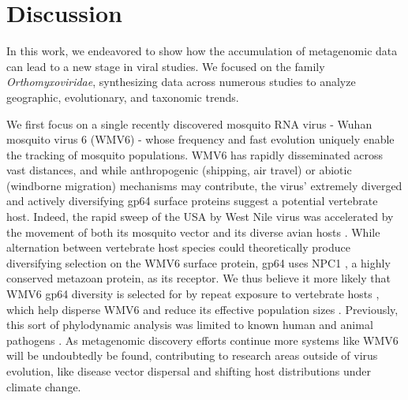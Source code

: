 \documentclass[11pt,twocolumn]{article}
\begin{document}
\section{Discussion}

In this work, we endeavored to show how the accumulation of metagenomic data can lead to a new stage in viral studies. We focused on the family \textit{Orthomyxoviridae}, synthesizing data across numerous studies to analyze geographic, evolutionary, and taxonomic trends.

We first focus on a single recently discovered mosquito RNA virus - Wuhan mosquito virus 6 \citep{li_unprecedented_2015} (WMV6) - whose frequency and fast evolution uniquely enable the tracking of mosquito populations. WMV6 has rapidly disseminated across vast distances, and while anthropogenic (shipping, air travel) \citep{lounibos_invasions_2002,fonseca_pathways_2006,bataille_evidence_2009} or abiotic (windborne migration) \citep{huestis_windborne_2019} mechanisms may contribute, the virus' extremely diverged and actively diversifying gp64 surface proteins suggest a potential vertebrate host. Indeed, the rapid sweep of the USA by West Nile virus was accelerated by the movement of both its mosquito vector and its diverse avian hosts \citep{di_giallonardo_fluid_2015}. While alternation between vertebrate host species could theoretically produce diversifying selection on the WMV6 surface protein, gp64 uses NPC1 \citep{li_baculovirus_2019}, a highly conserved metazoan protein, as its receptor. We thus believe it more likely that WMV6 gp64 diversity is selected for by repeat exposure to vertebrate hosts \citep{jong_antigenic_2007}, which help disperse WMV6 \citep{lycett_brief_2019} and reduce its effective population sizes \citep{bedford_strength_2011}. Previously, this sort of phylodynamic analysis was limited to known human and animal pathogens \citep{drummond_measurably_2003,wheeler_spatial_2010}. As metagenomic discovery efforts continue more systems like WMV6 will be undoubtedly be found, contributing to research areas outside of virus evolution, like disease vector dispersal and shifting host distributions under climate change.
\end{document}
